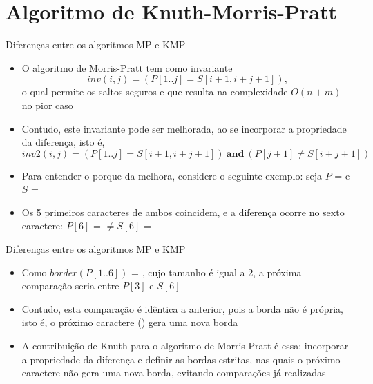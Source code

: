 \section{Algoritmo de Knuth-Morris-Pratt}


\begin{frame}[fragile]{Diferenças entre os algoritmos MP e KMP}

    \begin{itemize}
        \item O algoritmo de Morris-Pratt tem como invariante
        \[
            inv(i, j) = (P[1..j] = S[i + 1, i + j + 1]),
        \]
        o qual permite os saltos seguros e que resulta na complexidade $O(n + m)$ no pior caso

        \item Contudo, este invariante pode ser melhorada, ao se incorporar a propriedade da 
        diferença, isto é,
        \[
            inv2(i, j) = (P[1..j] = S[i + 1, i + j + 1])\ \mathbf{and}\ (P[j + 1] \neq S[i + j + 1])
        \]

        \item Para entender o porque da melhora, considere o seguinte exemplo: seja 
            $P$ =  e $S$ = 

        \item Os 5 primeiros caracteres de ambos coincidem, e a diferença ocorre no sexto 
            caractere: $P[6]$ =  $\neq S[6]$ = 

    \end{itemize}

\end{frame}

\begin{frame}[fragile]{Diferenças entre os algoritmos MP e KMP}

    \begin{itemize}
        \item Como $border(P[1..6])$ = , cujo tamanho é igual a 2, a próxima 
            comparação seria entre $P[3]$ e $S[6]$

        \item Contudo, esta comparação é idêntica a anterior, pois a borda  não é 
            própria, isto é, o próximo caractere () gera uma nova borda 

        \item A contribuição de Knuth para o algoritmo de Morris-Pratt é essa: incorporar a 
            propriedade da diferença e definir as bordas estritas, nas quais o próximo caractere 
            não gera uma nova borda, evitando comparações já realizadas
    \end{itemize}

\end{frame}


